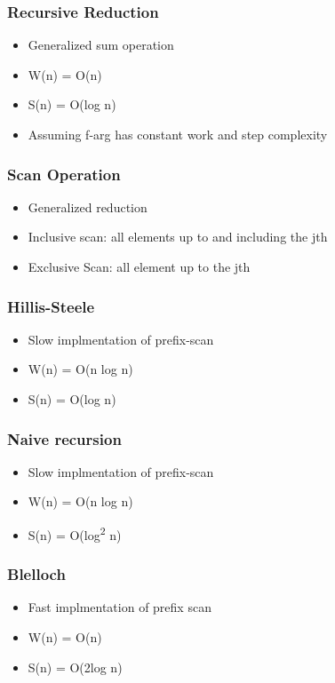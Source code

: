 \documentclass{assignments}
\begin{document}
\subsubsection*{Recursive Reduction}
\label{sec:orge5e5493}
\begin{itemize}
\item Generalized sum operation
\item W(n) = O(n)
\item S(n) = O(log n)
\item Assuming f-arg has constant work and step complexity
\end{itemize}
\subsubsection*{Scan Operation}
\label{sec:org3034df1}
\begin{itemize}
\item Generalized reduction
\item Inclusive scan: all elements up to and including the jth
\item Exclusive Scan: all element up to the jth
\end{itemize}
\subsubsection*{Hillis-Steele}
\label{sec:org66ad2d2}
\begin{itemize}
\item Slow implmentation of prefix-scan
\item W(n) = O(n log n)
\item S(n) = O(log n)
\end{itemize}
\subsubsection*{Naive recursion}
\label{sec:orgf9721fb}
\begin{itemize}
\item Slow implmentation of prefix-scan
\item W(n) = O(n log n)
\item S(n) = O(log\textsuperscript{2} n)
\end{itemize}
\subsubsection*{Blelloch}
\label{sec:orga0595ac}
\begin{itemize}
\item Fast implmentation of prefix scan
\item W(n) = O(n)
\item S(n) = O(2log n)
\end{itemize}
\end{document}
